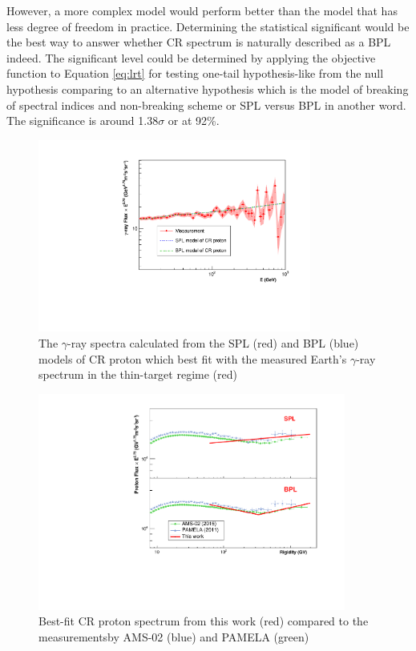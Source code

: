 However, a more complex model would perform better than the model 
that has less degree of freedom in practice. Determining the 
statistical significant would be the best way to answer whether 
CR spectrum is naturally described as a BPL indeed.
The significant level could be determined by applying the objective function
to Equation \ref{eq:lrt} for testing one-tail hypothesis-like
from the null hypothesis comparing to an alternative
hypothesis which is the model of breaking of spectral indices
and non-breaking scheme or SPL versus BPL in another word.
The significance is around 1.38$\sigma$ or at 92\%.


\begin{figure}[h!]
    \centering
    \includegraphics[width=0.8\textwidth]{content/result_and_discussion/figures/fitted_result.pdf}
    \caption{
        The $\gamma$-ray spectra calculated from the SPL (red)
        and BPL (blue) models of CR proton which best fit with the
        measured Earth's $\gamma$-ray spectrum in the thin-target
        regime (red)
    }
    \label{fig:fitted_gamma_specgtrum}
\end{figure}

\newpage 

\begin{figure}[h!]
    \centering
    \includegraphics[width=0.9\textwidth]{content/result_and_discussion/figures/ProtonSpectrumModelMeasurement.pdf}
    \caption{
        Best-fit CR proton spectrum from this work (red)
        compared to the measurementsby AMS-02 (blue) and
        PAMELA (green)
    }
    \label{fig:fitted_cr_proton}
\end{figure}

